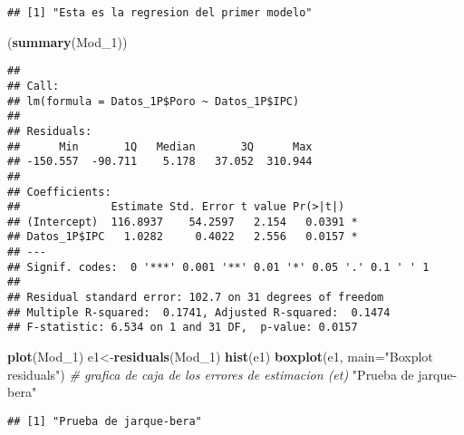 \documentclass[
]{article}
\newenvironment{Shaded}{\begin{snugshade}}{\end{snugshade}}
\newcommand{\CommentTok}[1]{\textcolor[rgb]{0.56,0.35,0.01}{\textit{#1}}}
\newcommand{\DataTypeTok}[1]{\textcolor[rgb]{0.13,0.29,0.53}{#1}}
\newcommand{\DecValTok}[1]{\textcolor[rgb]{0.00,0.00,0.81}{#1}}
\newcommand{\KeywordTok}[1]{\textcolor[rgb]{0.13,0.29,0.53}{\textbf{#1}}}
\newcommand{\NormalTok}[1]{#1}
\newcommand{\OperatorTok}[1]{\textcolor[rgb]{0.81,0.36,0.00}{\textbf{#1}}}
\newcommand{\StringTok}[1]{\textcolor[rgb]{0.31,0.60,0.02}{#1}}
\begin{document}
\begin{Shaded}
\end{Shaded}

\begin{verbatim}
## [1] "Esta es la regresion del primer modelo"
\end{verbatim}

\begin{Shaded}
\begin{Highlighting}[]
\NormalTok{(}\KeywordTok{summary}\NormalTok{(Mod_}\DecValTok{1}\NormalTok{))}
\end{Highlighting}
\end{Shaded}

\begin{verbatim}
## 
## Call:
## lm(formula = Datos_1P$Poro ~ Datos_1P$IPC)
## 
## Residuals:
##      Min       1Q   Median       3Q      Max 
## -150.557  -90.711    5.178   37.052  310.944 
## 
## Coefficients:
##              Estimate Std. Error t value Pr(>|t|)  
## (Intercept)  116.8937    54.2597   2.154   0.0391 *
## Datos_1P$IPC   1.0282     0.4022   2.556   0.0157 *
## ---
## Signif. codes:  0 '***' 0.001 '**' 0.01 '*' 0.05 '.' 0.1 ' ' 1
## 
## Residual standard error: 102.7 on 31 degrees of freedom
## Multiple R-squared:  0.1741, Adjusted R-squared:  0.1474 
## F-statistic: 6.534 on 1 and 31 DF,  p-value: 0.0157
\end{verbatim}

\begin{Shaded}
\begin{Highlighting}[]
\KeywordTok{plot}\NormalTok{(Mod_}\DecValTok{1}\NormalTok{)}
\NormalTok{e1<-}\KeywordTok{residuals}\NormalTok{(Mod_}\DecValTok{1}\NormalTok{)}
\KeywordTok{hist}\NormalTok{(e1)}
\KeywordTok{boxplot}\NormalTok{(e1, }\DataTypeTok{main=}\StringTok{"Boxplot residuals"}\NormalTok{) }\CommentTok{# grafica de caja de los errores de estimacion (et)}
\StringTok{"Prueba de jarque-bera"}
\end{Highlighting}
\end{Shaded}

\begin{verbatim}
## [1] "Prueba de jarque-bera"
\end{verbatim}
\end{document}
